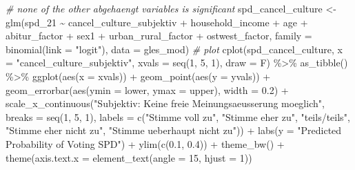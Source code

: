 \documentclass[
]{article}
\newenvironment{Shaded}{\begin{snugshade}}{\end{snugshade}}
\newcommand{\AttributeTok}[1]{\textcolor[rgb]{0.77,0.63,0.00}{#1}}
\newcommand{\CommentTok}[1]{\textcolor[rgb]{0.56,0.35,0.01}{\textit{#1}}}
\newcommand{\DecValTok}[1]{\textcolor[rgb]{0.00,0.00,0.81}{#1}}
\newcommand{\FloatTok}[1]{\textcolor[rgb]{0.00,0.00,0.81}{#1}}
\newcommand{\FunctionTok}[1]{\textcolor[rgb]{0.00,0.00,0.00}{#1}}
\newcommand{\NormalTok}[1]{#1}
\newcommand{\OtherTok}[1]{\textcolor[rgb]{0.56,0.35,0.01}{#1}}
\newcommand{\SpecialCharTok}[1]{\textcolor[rgb]{0.00,0.00,0.00}{#1}}
\newcommand{\StringTok}[1]{\textcolor[rgb]{0.31,0.60,0.02}{#1}}
\begin{document}
\begin{Shaded}
\begin{Highlighting}[]
\CommentTok{\# none of the other abgehaengt variables is significant }
\NormalTok{spd\_cancel\_culture }\OtherTok{\textless{}{-}} \FunctionTok{glm}\NormalTok{(spd\_21 }\SpecialCharTok{\textasciitilde{}}\NormalTok{ cancel\_culture\_subjektiv }\SpecialCharTok{+}\NormalTok{ household\_income }\SpecialCharTok{+}\NormalTok{ age }\SpecialCharTok{+}\NormalTok{ abitur\_factor }\SpecialCharTok{+}\NormalTok{ sex1 }\SpecialCharTok{+}\NormalTok{ urban\_rural\_factor }\SpecialCharTok{+}\NormalTok{ ostwest\_factor, }\AttributeTok{family =} \FunctionTok{binomial}\NormalTok{(}\AttributeTok{link =} \StringTok{"logit"}\NormalTok{), }\AttributeTok{data =}\NormalTok{ gles\_mod)}
\CommentTok{\# plot }
\FunctionTok{cplot}\NormalTok{(spd\_cancel\_culture, }\AttributeTok{x =} \StringTok{"cancel\_culture\_subjektiv"}\NormalTok{, }
      \AttributeTok{xvals =} \FunctionTok{seq}\NormalTok{(}\DecValTok{1}\NormalTok{, }\DecValTok{5}\NormalTok{, }\DecValTok{1}\NormalTok{), }\AttributeTok{draw =}\NormalTok{ F) }\SpecialCharTok{\%\textgreater{}\%} 
  \FunctionTok{as\_tibble}\NormalTok{() }\SpecialCharTok{\%\textgreater{}\%}
  \FunctionTok{ggplot}\NormalTok{(}\FunctionTok{aes}\NormalTok{(}\AttributeTok{x =}\NormalTok{ xvals)) }\SpecialCharTok{+}
  \FunctionTok{geom\_point}\NormalTok{(}\FunctionTok{aes}\NormalTok{(}\AttributeTok{y =}\NormalTok{ yvals)) }\SpecialCharTok{+}
  \FunctionTok{geom\_errorbar}\NormalTok{(}\FunctionTok{aes}\NormalTok{(}\AttributeTok{ymin =}\NormalTok{ lower, }\AttributeTok{ymax =}\NormalTok{ upper), }\AttributeTok{width =} \FloatTok{0.2}\NormalTok{) }\SpecialCharTok{+}
  \FunctionTok{scale\_x\_continuous}\NormalTok{(}\StringTok{"Subjektiv: Keine freie Meinungsaeusserung moeglich"}\NormalTok{, }
                   \AttributeTok{breaks =} \FunctionTok{seq}\NormalTok{(}\DecValTok{1}\NormalTok{, }\DecValTok{5}\NormalTok{, }\DecValTok{1}\NormalTok{),}
                   \AttributeTok{labels =} \FunctionTok{c}\NormalTok{(}\StringTok{"Stimme voll zu"}\NormalTok{, }\StringTok{"Stimme eher zu"}\NormalTok{,}
                              \StringTok{"teils/teils"}\NormalTok{, }\StringTok{"Stimme eher nicht zu"}\NormalTok{,}
                              \StringTok{"Stimme ueberhaupt nicht zu"}\NormalTok{)) }\SpecialCharTok{+}
  \FunctionTok{labs}\NormalTok{(}\AttributeTok{y =} \StringTok{"Predicted Probability of Voting SPD"}\NormalTok{) }\SpecialCharTok{+}
  \FunctionTok{ylim}\NormalTok{(}\FunctionTok{c}\NormalTok{(}\FloatTok{0.1}\NormalTok{, }\FloatTok{0.4}\NormalTok{)) }\SpecialCharTok{+}
  \FunctionTok{theme\_bw}\NormalTok{() }\SpecialCharTok{+}
  \FunctionTok{theme}\NormalTok{(}\AttributeTok{axis.text.x =} \FunctionTok{element\_text}\NormalTok{(}\AttributeTok{angle =} \DecValTok{15}\NormalTok{, }\AttributeTok{hjust =} \DecValTok{1}\NormalTok{))}
\end{Highlighting}
\end{Shaded}
\end{document}
